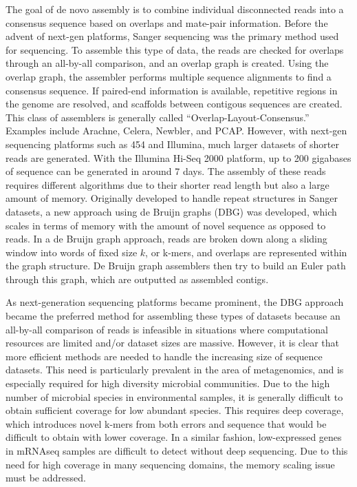 \documentclass[12pt]{article} \usepackage{simplemargins}
\begin{document}
The goal of de novo assembly is to combine individual disconnected
reads into a consensus sequence based on overlaps and mate-pair
information. Before the advent of next-gen platforms, Sanger
sequencing was the primary method used for sequencing. To assemble 
this type of data, the reads are checked for overlaps through an 
all-by-all comparison, and an overlap graph is created\cite{assemblyreview}.
Using the overlap graph, the assembler 
performs multiple sequence alignments to find a consensus sequence. 
If paired-end information is available, repetitive regions in the 
genome are resolved, and scaffolds between contigous sequences are 
created. This class of assemblers is generally called 
``Overlap-Layout-Consensus.'' Examples include
Arachne\cite{arachne}, Celera\cite{celera}, Newbler\cite{newbler}, and 
PCAP\cite{pcap}. However, with next-gen sequencing 
platforms such as 454 and Illumina, much larger datasets of shorter reads 
are generated. With the Illumina Hi-Seq 2000 platform, up to 200 
gigabases of sequence can be generated 
in around 7 days. The assembly of 
these reads requires different
algorithms due to their shorter read length but also a 
large amount of memory. Originally developed to 
handle repeat structures in Sanger datasets, a new approach using de Bruijn 
graphs (DBG) was developed\cite{pmid11504945}, which scales in terms of 
memory with the amount of novel sequence as opposed to reads.
In a de Bruijn
graph approach, reads are broken down along a sliding window into words of fixed
size $k$, or k-mers, and overlaps are represented within the graph 
structure.
De Bruijn graph assemblers then try to build an Euler path through
this graph, which are outputted as assembled contigs\cite{assemblyreview}.

As next-generation sequencing platforms became prominent, the DBG approach
became the preferred method for assembling these types of datasets
because an all-by-all comparison of reads is infeasible in situations where 
computational resources are limited and/or dataset sizes are massive. However, it
is clear that more efficient methods are needed to handle the
increasing size of sequence datasets. This need is
particularly prevalent in the area of metagenomics, and is especially
required for high diversity
microbial communities. Due to the high number of microbial species 
in environmental samples, it is generally difficult to obtain sufficient coverage 
for low abundant species. This 
requires deep coverage, which introduces novel k-mers from both 
errors and sequence that 
would be difficult to obtain with lower coverage. In a similar fashion, 
low-expressed genes in mRNAseq samples are difficult to detect without deep 
sequencing. Due to this need for high coverage in many sequencing 
domains, the memory scaling issue must be addressed.
\end{document}
